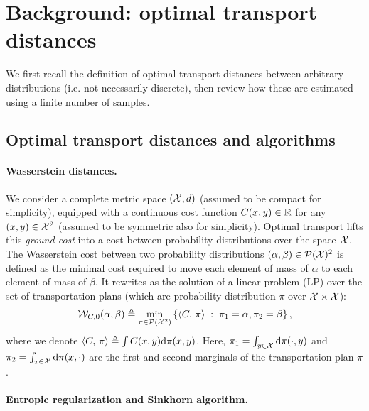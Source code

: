 \section{Background: optimal transport distances}

We first recall the definition of optimal transport distances between arbitrary distributions (i.e. not necessarily discrete), then review how these are estimated using a finite number of samples.

\subsection{Optimal transport distances and algorithms}

\paragraph{Wasserstein distances.} 

We consider a complete metric space $(\mathcal{X},d)$ (assumed to be compact for simplicity), equipped
with a continuous cost function $C(x,y) \in \mathbb{R}$ for any $(x,y) \in \mathcal{X}^2$ (assumed to be symmetric also for simplicity). 
%
Optimal transport lifts this \textit{ground cost} into a cost between probability
distributions over the space $\mathcal{X}$. 
%
The Wasserstein cost between two probability distributions $(\alpha, \beta) \in \mathcal{P}(\mathcal{X})^2$ is defined as the minimal cost required to move each element of mass of $\alpha$ to each element of mass of $\beta$. It rewrites as the solution of a
linear problem (LP) over the set of transportation plans (which are probability distribution $\pi$ over $\mathcal{X} \times \mathcal{X}$):
\begin{equation}\label{eq:wass_0}
    \mathcal{W}_{C,0}(\alpha, \beta) \triangleq 
    \min_{\pi \in \mathcal{P}(\mathcal{X}^2)}
    \left\{ 
    	\langle C,\,\pi\rangle
	 \;:\;  \pi_1=\alpha, \pi_2=\beta \right\},
\end{equation}
where we denote $\langle C,\,\pi\rangle \triangleq \int C(x,y) \textrm{d}\pi(x,y)$. Here,  
$\pi_1 = \int_{y\in \mathcal{X}} \textrm{d} \pi(\cdot, y)$ and $\pi_2 = \int_{x\in \mathcal{X}} \textrm{d}
\pi(x, \cdot)$ are the first and second marginals of the transportation plan $\pi$. 
%

\paragraph{Entropic regularization and Sinkhorn algorithm.} 


